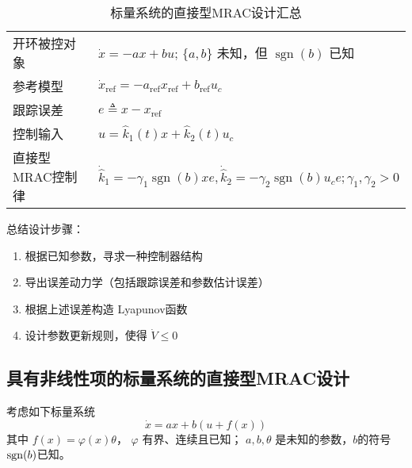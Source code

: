 \begin{table}[htbp]
  \centering
  \setcellgapes{4pt}
  \makegapedcells
  \caption{标量系统的直接型MRAC设计汇总}
  \begin{tabular}{p{4.0cm}p{10.0cm}}
    \hline
    开环被控对象 & $\dot{x} = - a  x + b  u$; $\{ a, b \}$ 未知，但
    $\ensuremath{\operatorname{sgn}} (b)$ 已知\\
    参考模型 & $\dot{x}_{\ensuremath{\operatorname{ref}}} = -
    a_{\ensuremath{\operatorname{ref}}} x_{\ensuremath{\operatorname{ref}}} +
    b_{\ensuremath{\operatorname{ref}}} u_c$\\
    跟踪误差 & $e \triangleq x - x_{\ensuremath{\operatorname{ref}}}$\\
    控制输入 & $u = \hat{k}_1 (t) x + \hat{k}_2 (t) u_c$\\
    直接型MRAC控制律& $\dot{\hat{k}}_1 = -  \gamma_1
    \ensuremath{\operatorname{sgn}} (b) x  e, \dot{\hat{k}}_2 = -  \gamma_2
    \ensuremath{\operatorname{sgn}} (b)  u_c e ; \gamma_1, \gamma_2 > 0$\\
    \hline
  \end{tabular}
\end{table}

总结设计步骤：
\begin{enumerate}
  \item 根据已知参数，寻求一种控制器结构
  
  \item 导出误差动力学（包括跟踪误差和参数估计误差）
  
  \item 根据上述误差构造 Lyapunov函数
  
  \item 设计参数更新规则，使得 $\dot{V} \leq 0$
\end{enumerate}
\subsection{具有非线性项的标量系统的直接型MRAC设计}

考虑如下标量系统
\begin{equation}
  \dot{x} = a  x + b  (u + f (x)) \label{Sys:MRAC:nonlinear}
\end{equation}
其中 $f (x) = \varphi (x) \theta$， $\varphi$ 有界、连续且已知； $a, b, \theta$ 是未知的参数，$b$的符号$\operatorname{sgn}(b)$已知。

